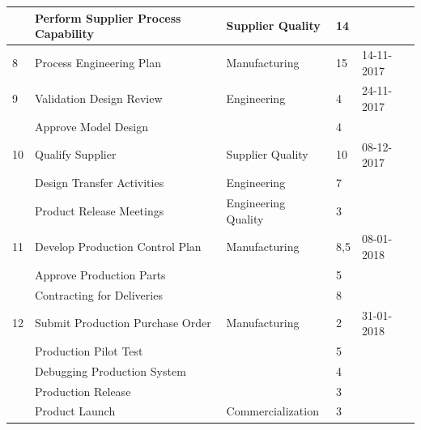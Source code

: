 \begin{landscape}
\begin{table}[!h]
\begin{tabular}{lllll}
          & Perform Supplier Process Capability   & Supplier Quality    & 14                   &             \\\hline
8         & Process Engineering Plan              & Manufacturing       & 15                   & 14-11-2017  \\\hline
9         & Validation Design Review              & Engineering         & 4                    & 24-11-2017  \\
          & Approve Model Design                  &                     & 4                    &             \\\hline
10        & Qualify Supplier                      & Supplier Quality    & 10                   & 08-12-2017  \\
          & Design Transfer Activities            & Engineering         & 7                    &             \\
          & Product Release Meetings              & Engineering Quality & 3                    &             \\\hline
11        & Develop Production Control Plan       & Manufacturing       & 8,5                  & 08-01-2018  \\
          & Approve Production Parts              &                     & 5                    &             \\
          & Contracting for Deliveries            &                     & 8                    &             \\\hline
12        & Submit Production Purchase Order      & Manufacturing       & 2                    & 31-01-2018  \\
          & Production Pilot Test                 &                     & 5                    &             \\
          & Debugging Production System           &                     & 4                    &             \\
          & Production Release                    &                     & 3                    &             \\
          & Product Launch                        & Commercialization   & 3                    &             \\
\end{tabular}
\end{table}

\end{landscape}

